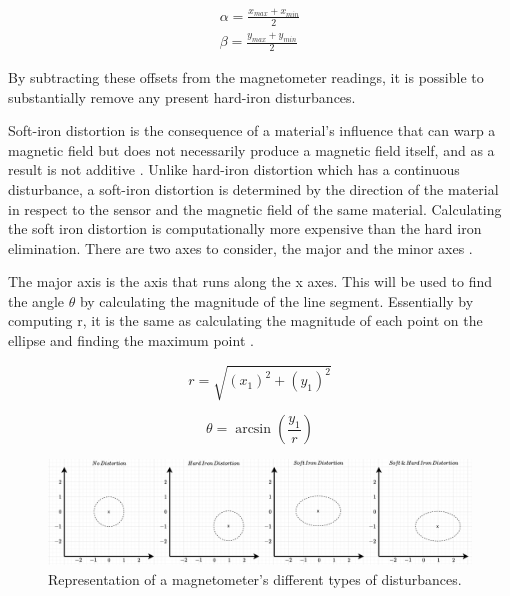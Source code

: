 \begin{equation}
    \begin{gathered}
        \alpha = \frac{x_{max}+x_{min}}{2}\\
        \beta = \frac{y_{max}+y_{min}}{2}
    \end{gathered}
\end{equation}

By subtracting these offsets from the magnetometer readings, it is possible to substantially remove any present hard-iron disturbances.

Soft-iron distortion is the consequence of a material's influence that can warp a magnetic field but does not necessarily produce a magnetic field itself, and as a result is not additive \cite{bachmann2004investigation}. Unlike hard-iron distortion which has a continuous disturbance, a soft-iron distortion is determined by the direction of the material in respect to the sensor and the magnetic field of the same material. Calculating the soft iron distortion is computationally more expensive than the hard iron elimination. There are two axes to consider, the major and the minor axes \cite{roetenberg2005compensation}.

The major axis is the axis that runs along the x axes. This will be used to find the angle $\theta$ by calculating the magnitude of the line segment. Essentially by computing r, it is the same as calculating the magnitude of each point on the ellipse and finding the maximum point \cite{daponte2017method}.

\begin{equation}
    r=\sqrt{(x_1)^2+(y_1)^2}
\end{equation}

\begin{equation}
    \theta=\arcsin(\frac{y_1}{r})
\end{equation}

\begin{figure}[!h]
    \centering
    \includegraphics[width=1\textwidth]{figures/magnetometer_distortion.pdf}
    \caption{Representation of a magnetometer's different types of disturbances. \cite{daponte2017method} }
    \label{fig:magnetometer_distortion}
\end{figure}



